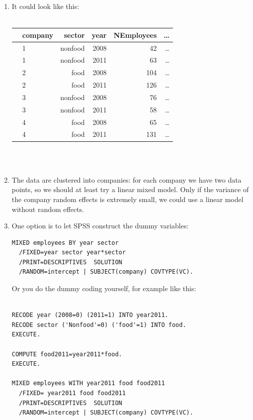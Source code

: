 \documentclass[]{book}\usepackage[]{graphicx}\usepackage[]{color}
\begin{document}
\begin{enumerate}
\item It could look like this:
\\
\\
\begin{tabular}{llrrrr}
   & company & sector  & year & NEmployees  & \dots  \\ \hline
  & 1 & nonfood  & 2008 & 42  & \dots  \\
  & 1 & nonfood  & 2011 & 63  & \dots  \\
  & 2 & food  & 2008 & 104  & \dots  \\
  & 2 & food  & 2011 & 126  & \dots  \\
  & 3 & nonfood  & 2008 & 76  & \dots  \\
  & 3 & nonfood  & 2011 & 58  & \dots  \\
  & 4 & food  & 2008 & 65  & \dots  \\
  & 4 & food  & 2011 & 131  & \dots  \\
\end{tabular}
\\
\\
\item The data are clustered into companies: for each company we have two data points, so we should at least try a linear mixed model. Only if the variance of the company random effects is extremely small, we could use a linear model without random effects.
\item One option is to let SPSS construct the dummy variables:

\begin{verbatim}
MIXED employees BY year sector 
  /FIXED=year sector year*sector
  /PRINT=DESCRIPTIVES  SOLUTION
  /RANDOM=intercept | SUBJECT(company) COVTYPE(VC).
\end{verbatim}

Or you do the dummy coding yourself, for example like this:

\begin{verbatim}

RECODE year (2008=0) (2011=1) INTO year2011.
RECODE sector ('Nonfood'=0) ('food'=1) INTO food.
EXECUTE.

COMPUTE food2011=year2011*food.
EXECUTE.

MIXED employees WITH year2011 food food2011
  /FIXED= year2011 food food2011
  /PRINT=DESCRIPTIVES  SOLUTION
  /RANDOM=intercept | SUBJECT(company) COVTYPE(VC).
\end{verbatim}


\end{enumerate}
\end{document}
